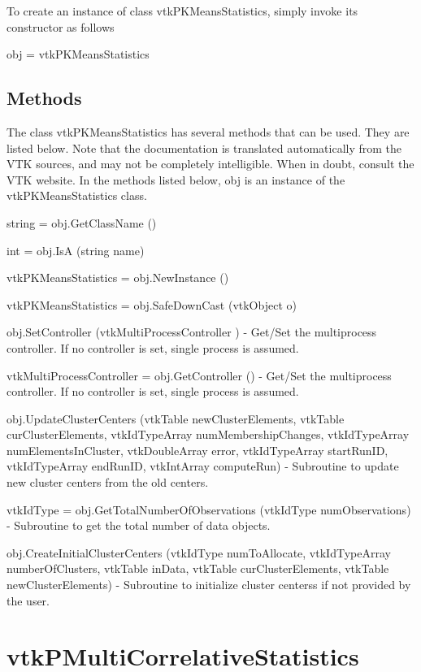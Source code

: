 To create an instance of class vtk\-P\-K\-Means\-Statistics, simply invoke its constructor as follows \begin{DoxyVerb}  obj = vtkPKMeansStatistics
\end{DoxyVerb}
 \hypertarget{vtkwidgets_vtkxyplotwidget_Methods}{}\subsection{Methods}\label{vtkwidgets_vtkxyplotwidget_Methods}
The class vtk\-P\-K\-Means\-Statistics has several methods that can be used. They are listed below. Note that the documentation is translated automatically from the V\-T\-K sources, and may not be completely intelligible. When in doubt, consult the V\-T\-K website. In the methods listed below, {\ttfamily obj} is an instance of the vtk\-P\-K\-Means\-Statistics class. 
\begin{DoxyItemize}
\item {\ttfamily string = obj.\-Get\-Class\-Name ()}  
\item {\ttfamily int = obj.\-Is\-A (string name)}  
\item {\ttfamily vtk\-P\-K\-Means\-Statistics = obj.\-New\-Instance ()}  
\item {\ttfamily vtk\-P\-K\-Means\-Statistics = obj.\-Safe\-Down\-Cast (vtk\-Object o)}  
\item {\ttfamily obj.\-Set\-Controller (vtk\-Multi\-Process\-Controller )} -\/ Get/\-Set the multiprocess controller. If no controller is set, single process is assumed.  
\item {\ttfamily vtk\-Multi\-Process\-Controller = obj.\-Get\-Controller ()} -\/ Get/\-Set the multiprocess controller. If no controller is set, single process is assumed.  
\item {\ttfamily obj.\-Update\-Cluster\-Centers (vtk\-Table new\-Cluster\-Elements, vtk\-Table cur\-Cluster\-Elements, vtk\-Id\-Type\-Array num\-Membership\-Changes, vtk\-Id\-Type\-Array num\-Elements\-In\-Cluster, vtk\-Double\-Array error, vtk\-Id\-Type\-Array start\-Run\-I\-D, vtk\-Id\-Type\-Array end\-Run\-I\-D, vtk\-Int\-Array compute\-Run)} -\/ Subroutine to update new cluster centers from the old centers.  
\item {\ttfamily vtk\-Id\-Type = obj.\-Get\-Total\-Number\-Of\-Observations (vtk\-Id\-Type num\-Observations)} -\/ Subroutine to get the total number of data objects.  
\item {\ttfamily obj.\-Create\-Initial\-Cluster\-Centers (vtk\-Id\-Type num\-To\-Allocate, vtk\-Id\-Type\-Array number\-Of\-Clusters, vtk\-Table in\-Data, vtk\-Table cur\-Cluster\-Elements, vtk\-Table new\-Cluster\-Elements)} -\/ Subroutine to initialize cluster centerss if not provided by the user.  
\end{DoxyItemize}\hypertarget{vtkinfovis_vtkpmulticorrelativestatistics}{}\section{vtk\-P\-Multi\-Correlative\-Statistics}\label{vtkinfovis_vtkpmulticorrelativestatistics}

